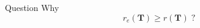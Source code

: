 \documentclass[xcolor=dvipsnames]{beamer}
\begin{document}
\begin{frame}
  \begin{bclogo}[arrondi=0.1, logo=\bcquestion, couleurBarre=Maroon] 
        {Question}
    Why
    \[
        r_e(\mathbf{T})\geq r(\mathbf{T}) \;?
    \]
  \end{bclogo}
\end{frame}
\end{document}
